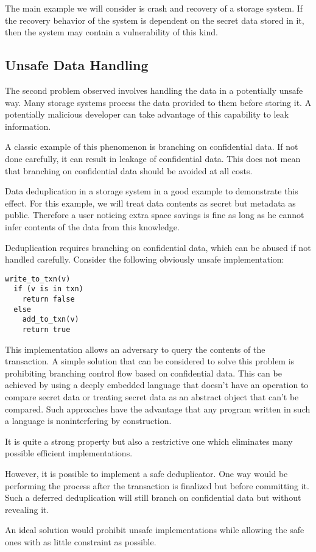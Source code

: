 The main example we will consider is crash and recovery of a storage system. If the recovery behavior of the system is dependent on the secret data stored in it, then the system may contain a vulnerability of this kind. 

\subsection{Unsafe Data Handling}
The second problem observed involves handling the data in a potentially unsafe way. Many storage systems process the data provided to them before storing it. A potentially malicious developer can take advantage of this capability to leak information.

A classic example of this phenomenon is branching on confidential data. If not done carefully, it can result in leakage of confidential data. This does not mean that branching on confidential data should be avoided at all costs.

Data deduplication in a storage system in a good example to demonstrate this effect. For this example, we will treat data contents as secret but metadata as public. Therefore a user noticing extra space savings is fine as long as he cannot infer contents of the data from this knowledge.

Deduplication requires branching on confidential data, which can be abused if not handled carefully. Consider the following obviously unsafe implementation:

\begin{lstlisting}
write_to_txn(v)
  if (v is in txn)
    return false
  else
    add_to_txn(v)
    return true
\end{lstlisting}

This implementation allows an adversary to query the contents of the transaction. 
A simple solution that can be considered to solve this problem is prohibiting branching control flow based on confidential data. This can be achieved by using a deeply embedded language that doesn't have an operation to compare secret data or treating secret data as an abstract object that can't be compared. Such approaches have the advantage 
that any program written in such a language is noninterfering by construction. 

It is quite a strong property but also a restrictive one which eliminates many possible efficient implementations.

However, it is possible to implement a safe deduplicator. One way would be performing the process after the transaction is finalized but before committing it. Such a deferred deduplication will still branch on confidential data but without revealing it.

An ideal solution would prohibit unsafe implementations while allowing the safe ones with as little constraint as possible.  

